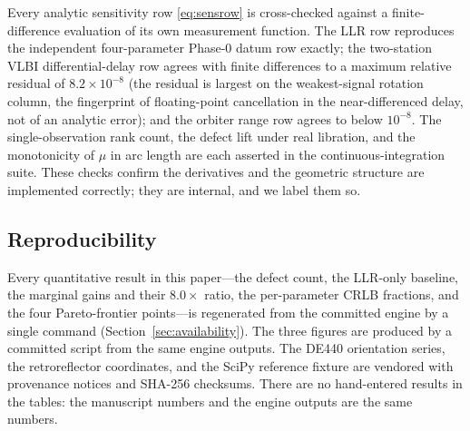 Every analytic sensitivity row \eqref{eq:sensrow} is cross-checked against a
finite-difference evaluation of its own measurement function. The LLR row
reproduces the independent four-parameter Phase-0 datum row exactly; the
two-station VLBI differential-delay row agrees with finite differences to a maximum
relative residual of $8.2\times10^{-8}$ (the residual is largest on the
weakest-signal rotation column, the fingerprint of floating-point cancellation in
the near-differenced delay, not of an analytic error); and the orbiter range row
agrees to below $10^{-8}$. The single-observation rank count, the defect lift under
real libration, and the monotonicity of $\mu$ in arc length are each asserted in
the continuous-integration suite. These checks confirm the derivatives and the
geometric structure are implemented correctly; they are internal, and we label them
so.

\subsection{Reproducibility}
\label{sec:reproducibility}

Every quantitative result in this paper---the defect count, the LLR-only baseline,
the marginal gains and their $8.0\times$ ratio, the per-parameter CRLB fractions,
and the four Pareto-frontier points---is regenerated from the committed engine by a
single command (Section~\ref{sec:availability}). The three figures are produced by
a committed script from the same engine outputs. The DE440 orientation series, the
retroreflector coordinates, and the SciPy reference fixture are vendored with
provenance notices and SHA-256 checksums. There are no hand-entered results in the
tables: the manuscript numbers and the engine outputs are the same numbers.

